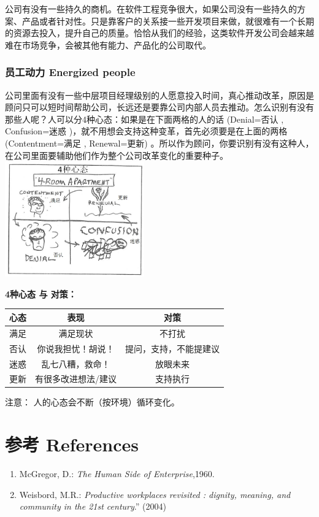 公司有没有一些持久的商机。在软件工程竞争很大，如果公司没有一些持久的方案、产品或者针对性。只是靠客户的关系接一些开发项目来做，就很难有一个长期的资源去投入，提升自己的质量。恰恰从我们的经验，这类软件开发公司会越来越难在市场竞争，会被其他有能力、产品化的公司取代。

\hypertarget{ux5458ux5de5ux52a8ux529b-energized-people}{%
\subsubsection{员工动力 Energized
people}\label{ux5458ux5de5ux52a8ux529b-energized-people}}

公司里面有没有一些中层项目经理级别的人愿意投入时间，真心推动改革，原因是顾问只可以短时间帮助公司，长远还是要靠公司内部人员去推动。怎么识别有没有那些人呢？人可以分4种心态：如果是在下面两格的人的话
(Denial=否认 , Confusion=迷惑
)，就不用想会支持这种变革，首先必须要是在上面的两格(Contentment=满足 ,
Renewal=更新) 
。所以作为顾问，你要识别有没有这种人，在公司里面要辅助他们作为整个公司改革变化的重要种子。\\
\includegraphics[width=6cm]{P335_4_room_apartment1.jpg}

\textbf{4种心态 与 对策：}


\begin{tabular}{|c|c|c|}
\hline
心态&表现&对策\\
\hline
满足&满足现状&不打扰\\
\hline
否认&你说我担忧！胡说！&提问，支持，不能提建议\\
\hline
迷惑&乱七八糟，救命！&放眼未来\\
\hline
更新&有很多改进想法/建议&支持执行\\
\hline
\end{tabular}

注意： 人的心态会不断（按环境）循环变化。

\hypertarget{ux9644ux4ef6}{%
\section{参考 References}\label{ux9644ux4ef6}}

\begin{enumerate}
\tightlist
\item
  McGregor, D.: \emph{The Human Side of Enterprise},1960.\\
\item
  Weisbord, M.R.: \emph{Productive workplaces revisited : dignity,
  meaning, and community in the 21st century}.'' (2004)
\end{enumerate}



